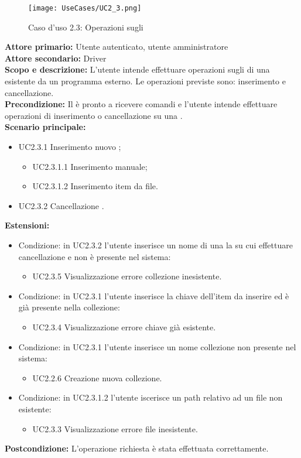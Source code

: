 \documentclass{scalatekids-article}
\begin{document}
\begin{figure}[H]
  \begin{center}
    \texttt{[image: UseCases/UC2\_3.png]}
    \caption*{Caso d'uso 2.3: Operazioni sugli }
  \end{center}
\end{figure}
\textbf{Attore primario:} Utente autenticato, utente amministratore\\
\textbf{Attore secondario:} Driver\\
\textbf{Scopo e descrizione:} L'utente intende effettuare operazioni sugli  di una  esistente da un programma  esterno. Le operazioni previste sono:
inserimento e cancellazione.\\
\textbf{Precondizione:} Il  è pronto a ricevere comandi e l'utente intende effettuare operazioni di inserimento o cancellazione su una .\\
\textbf{Scenario principale:}
\begin{itemize}
\item UC2.3.1 Inserimento nuovo ;
  \begin{itemize}
  \item UC2.3.1.1 Inserimento  manuale;
  \item UC2.3.1.2 Inserimento  item da file.
  \end{itemize}
\item UC2.3.2 Cancellazione .
\end{itemize}
\textbf{Estensioni:}
\begin{itemize}
\item Condizione: in UC2.3.2 l'utente inserisce un nome di una la  su cui effettuare cancellazione e non è presente nel sistema:
  \begin{itemize}
  \item UC2.3.5 Visualizzazione errore collezione inesistente.
  \end{itemize}
\item Condizione: in UC2.3.1 l'utente inserisce la chiave dell'item da inserire ed è già presente nella collezione:
  \begin{itemize}
  \item UC2.3.4 Visualizzazione errore chiave già esistente.
  \end{itemize}
\item Condizione: in UC2.3.1 l'utente inserisce un nome collezione non presente nel sistema:
  \begin{itemize}
  \item UC2.2.6 Creazione nuova collezione.
  \end{itemize}
\item Condizione: in UC2.3.1.2 l'utente iscerisce un path relativo ad un file non esistente:
  \begin{itemize}
  \item UC2.3.3 Visualizzazione errore file inesistente.
  \end{itemize}
\end{itemize}
\textbf{Postcondizione:} L'operazione richiesta è stata effettuata correttamente.
\end{document}
